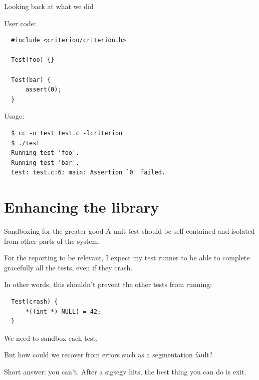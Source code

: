 \documentclass[10pt]{beamer}
\begin{document}
\begin{frame}[fragile]{Looking back at what we did}

  User code:
  \begin{lstlisting}
  #include <criterion/criterion.h>

  Test(foo) {}

  Test(bar) {
      assert(0);
  }
  \end{lstlisting}

  Usage:
  \begin{verbatim}
  $ cc -o test test.c -lcriterion
  $ ./test
  Running test 'foo'.
  Running test 'bar'.
  test: test.c:6: main: Assertion `0' failed.
  \end{verbatim}
\end{frame}


\section{Enhancing the library}

\begin{frame}[fragile]{Sandboxing for the greater good}
  A unit test should be self-contained and isolated from other parts of the system.

  For the reporting to be relevant, I expect my test runner to be able to complete
  gracefully all the tests, even if they crash.

  \pause{}

  In other words, this shouldn't prevent the other tests from running:
  \begin{lstlisting}
  Test(crash) {
      *((int *) NULL) = 42;
  }
  \end{lstlisting}

  \pause{}

  We need to sandbox each test.

  But how could we recover from errors such as a segmentation fault?

  \pause{}

  Short answer: you can't. After a sigsegv hits, the best thing you can do is exit.

\end{frame}
\end{document}
